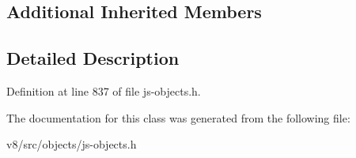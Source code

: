 \subsection*{Additional Inherited Members}


\subsection{Detailed Description}


Definition at line 837 of file js-\/objects.\+h.



The documentation for this class was generated from the following file\+:\begin{DoxyCompactItemize}
\item 
v8/src/objects/js-\/objects.\+h\end{DoxyCompactItemize}
